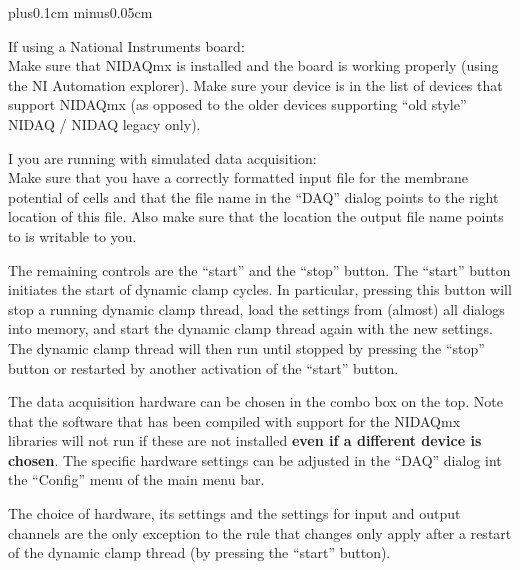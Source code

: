 \documentclass{article}
\makeatletter
\newenvironment{myenum}{
\begin{list}{\labelenumi}{\setlength{\leftmargin}{1.3em}
  \setcounter{enumi}{0}
  \renewcommand{\item}{\addtocounter{enumi}{1}\unskip \vspace{-0.1cm}\@inmatherr\item
  \@ifnextchar [\@item{\@noitemargtrue \@item[\@itemlabel]} \unskip}}
  \itemsep0.1cm plus0.1cm minus0.05cm
  \listparindent0cm
  \setlength{\labelsep}{0.5em}
  \setlength{\labelwidth}{0.8em}}
{\end{list}}
\makeatother
\begin{document}
\begin{myenum}
\addtocounter{enumi}{1}
\item If using a National Instruments board: \\
Make sure that NIDAQmx is installed and the board is working properly
(using the NI Automation explorer). Make sure your device is in the
list of devices that support NIDAQmx (as opposed to the older devices
supporting ``old style'' NIDAQ / NIDAQ legacy only).
\item I you are running with simulated data acquisition: \\
Make sure that you have a correctly formatted input file for the
membrane potential of cells and that the file name in the ``DAQ''
dialog points to the right location of this file. Also make sure that the
location the output file name points to is writable to you.
\end{myenum}

The remaining controls are the ``start'' and the ``stop'' button.  The
``start'' button initiates the start of dynamic clamp cycles. In
particular, pressing this button will stop a running dynamic clamp
thread, load the settings from (almost) all dialogs into memory, and
start the dynamic clamp thread again with the new settings. The
dynamic clamp thread will then run until stopped by pressing the
``stop'' button or restarted by another activation of the ``start'' button.

The data acquisition hardware can be chosen in the combo box on the
top. Note that the software that has been compiled with support for
the NIDAQmx libraries will not run if these are not installed {\bf
  even if a different device is chosen}. The specific hardware
settings can be adjusted in the ``DAQ'' dialog int the ``Config''
menu of the main menu bar.

The choice of hardware, its settings and the settings for input and
output channels are the only exception to the rule that changes only
apply after a restart of the dynamic clamp thread (by pressing the ``start''
button).
\end{document}
